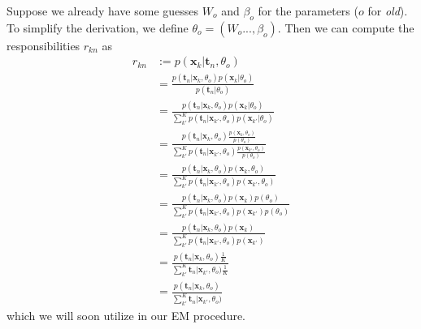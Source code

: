 Suppose we already have some guesses $W_o$ and $\beta_o$ for the parameters ($o$ for \textit{old}). To simplify the derivation, we define $\theta_o=(W_o..., \beta_o)$. Then we can compute the responsibilities $r_{kn}$ as
\begin{equation}
  \begin{aligned}
    r_{kn} &:= p(\mathbf{x}_k \vert \mathbf{t}_n,\theta_o) \\
    &= \frac{p(\mathbf{t}_n\vert \mathbf{x}_k, \theta_o)p(\mathbf{x}_k \vert \theta_o)}{p(\mathbf{t}_n\vert\theta_o)} \\
    &= \frac{p(\mathbf{t}_n\vert \mathbf{x}_k,\theta_o)p(\mathbf{x}_k\vert \theta_o)}{\sum_{k'}^Kp(\mathbf{t}_n\vert \mathbf{x}_{k'},\theta_o)p(\mathbf{x}_{k'}\vert\theta_o)} \\
    &= \frac{p(\mathbf{t}_n\vert \mathbf{x}_k,\theta_o)\frac{p(\mathbf{x}_k,\theta_o)}{p(\theta_o)}}{\sum_{k'}^Kp(\mathbf{t}_n\vert \mathbf{x}_{k'},\theta_o)\frac{p(\mathbf{x}_{k'},\theta_o)}{p(\theta_o)}} \\
    &= \frac{p(\mathbf{t}_n\vert \mathbf{x}_k,\theta_o)p(\mathbf{x}_k,\theta_o)}{\sum_{k'}^Kp(\mathbf{t}_n\vert \mathbf{x}_{k'},\theta_o)p(\mathbf{x}_{k'},\theta_o)} \\
    &= \frac{p(\mathbf{t}_n\vert \mathbf{x}_k,\theta_o)p(\mathbf{x}_k)p(\theta_o)}{\sum_{k'}^Kp(\mathbf{t}_n\vert \mathbf{x}_{k'},\theta_o)p(\mathbf{x}_{k'})p(\theta_o)} \\
    &= \frac{p(\mathbf{t}_n\vert \mathbf{x}_k,\theta_o)p(\mathbf{x}_k)}{\sum_{k'}^Kp(\mathbf{t}_n\vert \mathbf{x}_{k'},\theta_o)p(\mathbf{x}_{k'})} \\
    &= \frac{p(\mathbf{t}_n\vert \mathbf{x}_k,\theta_o)\frac{1}{K}}{\sum_{k'}^K\mathbf{t}_n\vert \mathbf{x}_{k'},\theta_o)\frac{1}{K}} \\
    &= \frac{p(\mathbf{t}_n\vert \mathbf{x}_k,\theta_o)}{\sum_{k'}^K\mathbf{t}_n\vert \mathbf{x}_{k'},\theta_o)}
  \end{aligned}
\end{equation}
which we will soon utilize in our EM procedure.

